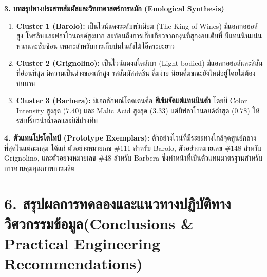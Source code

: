 \documentclass[12pt,a4paper]{article}
\begin{document}
\begin{ansbox}[unbreakable, fontupper={\fontsize{9.1pt}{11.8pt}\selectfont}, left=6pt, right=6pt, top=3pt, bottom=3pt]
\vspace{-0.3em}
\noindent\textbf{\normalsize 3. บทสรุปทางประสาทสัมผัสและวิทยาศาสตร์การหมัก (Enological Synthesis)}\par\vspace{0.04em}
\begin{enumerate}[leftmargin=1.2em, itemsep=0.3pt, topsep=0.3pt]
    \item \textbf{Cluster 1 (Barolo):} เป็นไวน์แดงระดับพรีเมียม (The King of Wines) มีแอลกอฮอล์สูง โพรลีนและฟลาโวนอยด์สูงมาก สะท้อนถึงการเก็บเกี่ยวจากองุ่นที่สุกงอมเต็มที่ มีแทนนินแน่นหนาและซับซ้อน เหมาะสำหรับการเก็บบ่มในถังไม้โอ๊คระยะยาว
    \item \textbf{Cluster 2 (Grignolino):} เป็นไวน์แดงสไตล์เบา (Light-bodied) มีแอลกอฮอล์และสีสันที่อ่อนที่สุด มีความเป็นด่างของเถ้าสูง รสสัมผัสสดชื่น ดื่มง่าย นิยมดื่มขณะยังใหม่อยู่โดยไม่ต้องบ่มนาน
    \item \textbf{Cluster 3 (Barbera):} มีเอกลักษณ์โดดเด่นคือ \textbf{สีเข้มจัดแต่แทนนินต่ำ} โดยมี Color Intensity สูงสุด ($7.40$) และ Malic Acid สูงสุด ($3.33$) แต่มีฟลาโวนอยด์ต่ำสุด ($0.78$) ให้รสเปรี้ยวนำฉ่ำคอและมีสีม่วงทึบ
\end{enumerate}

\vspace{0.08em}
\noindent\textbf{\normalsize 4. ตัวแทนโปรโตไทป์ (Prototype Exemplars):} ตัวอย่างไวน์ที่มีระยะทางใกล้จุดศูนย์กลางที่สุดในแต่ละกลุ่ม ได้แก่ ตัวอย่างหมายเลข \#111 สำหรับ Barolo, ตัวอย่างหมายเลข \#148 สำหรับ Grignolino, และตัวอย่างหมายเลข \#48 สำหรับ Barbera ซึ่งทำหน้าที่เป็นตัวแทนมาตรฐานสำหรับการควบคุมคุณภาพการผลิต
\end{ansbox}

\clearpage
\section*{6. สรุปผลการทดลองและแนวทางปฏิบัติทางวิศวกรรมข้อมูล\newline \large(Conclusions \& Practical Engineering Recommendations)}
\end{document}
